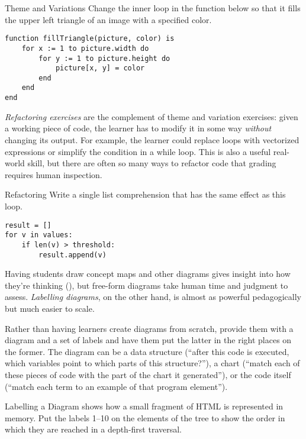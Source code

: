 \begin{aside}{Theme and Variations}
  Change the inner loop in the function below
  so that it fills the upper left triangle of an image with a specified color.

\begin{verbatim}
function fillTriangle(picture, color) is
    for x := 1 to picture.width do
        for y := 1 to picture.height do
            picture[x, y] = color
        end
    end
end
\end{verbatim}
\end{aside}

\emph{Refactoring exercises} are the complement of theme and variation exercises:
given a working piece of code,
the learner has to modify it in some way \emph{without} changing its output.
For example,
the learner could replace loops with vectorized expressions
or simplify the condition in a while loop.
This is also a useful real-world skill,
but there are often so many ways to refactor code
that grading requires human inspection.

\begin{aside}{Refactoring}
  Write a single list comprehension
  that has the same effect as this loop.

\begin{verbatim}
result = []
for v in values:
    if len(v) > threshold:
        result.append(v)
\end{verbatim}
\end{aside}


Having students draw concept maps and other diagrams
gives insight into how they're thinking (),
but free-form diagrams take human time and judgment to assess.
\emph{Labelling diagrams},
on the other hand,
is almost as powerful pedagogically
but much easier to scale.

Rather than having learners create diagrams from scratch,
provide them with a diagram and a set of labels
and have them put the latter in the right places on the former.
The diagram can be a data structure
(``after this code is executed, which variables point to which parts of this structure?''),
a chart (``match each of these pieces of code with the part of the chart it generated''),
or the code itself (``match each term to an example of that program element'').

\begin{aside}{Labelling a Diagram}
   shows
  how a small fragment of HTML is represented in memory.
  Put the labels 1--10 on the elements of the tree
  to show the order in which they are reached in a depth-first traversal.
\end{aside}


